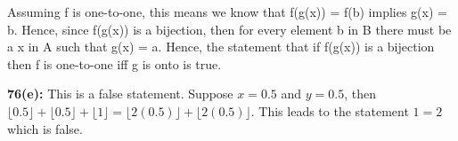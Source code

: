 \documentclass[12pt]{article}  %
\begin{document}
Assuming f is one-to-one, this means we know that f(g(x)) = f(b) implies g(x) = b.
Hence, since f(g(x)) is a bijection, then for every element b in B there must be a 
x in A such that g(x) = a. Hence, the statement that if f(g(x)) is a bijection
then f is one-to-one iff g is onto is true.

\noindent
{\bf 76(e):}
This is a false statement. Suppose $x = 0.5$ and $y = 0.5$, then 
$\lfloor 0.5 \rfloor + \lfloor 0.5 \rfloor + \lfloor 1 \rfloor = \lfloor 2(0.5) \rfloor + 
\lfloor 2(0.5) \rfloor$. This leads to the statement $1 = 2$ which is false.
\end{document}
